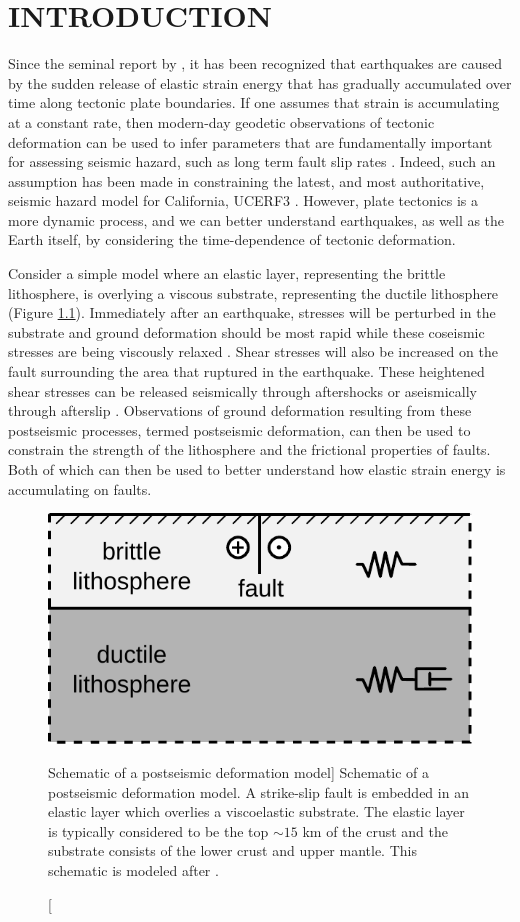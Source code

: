 \chapter{INTRODUCTION}
Since the seminal report by \citet{Reid1910}, it has been recognized that earthquakes are caused by the sudden release of elastic strain energy that has gradually accumulated over time along tectonic plate boundaries. If one assumes that strain is accumulating at a constant rate, then modern-day geodetic observations of tectonic deformation can be used to infer parameters that are fundamentally important for assessing seismic hazard, such as long term fault slip rates \citep[e.g.,][]{Savage1973,Meade2005}. Indeed, such an assumption has been made in constraining the latest, and most authoritative, seismic hazard model for California, UCERF3 \citep{Field2014}. However, plate tectonics is a more dynamic process, and we can better understand earthquakes, as well as the Earth itself, by considering the time-dependence of tectonic deformation. 

Consider a simple model where an elastic layer, representing the brittle lithosphere, is overlying a viscous substrate, representing the ductile lithosphere (Figure \ref{intro:fig:1}). Immediately after an earthquake, stresses will be perturbed in the substrate and ground deformation should be most rapid while these coseismic stresses are being viscously relaxed \citep{Nur1974,Savage1978}. Shear stresses will also be increased on the fault surrounding the area that ruptured in the earthquake. These heightened shear stresses can be released seismically through aftershocks or aseismically through afterslip \citep{Marone1991}. Observations of ground deformation resulting from these postseismic processes, termed postseismic deformation, can then be used to constrain the strength of the lithosphere and the frictional properties of faults. Both of which can then be used to better understand how elastic strain energy is accumulating on faults. 

\begin{figure}
\includegraphics{schematic}
\caption
[Schematic of a postseismic deformation model]
{Schematic of a postseismic deformation model. A strike-slip fault is embedded in an elastic layer which overlies a viscoelastic substrate. The elastic layer is typically considered to be the top ${\sim}15$ km of the crust and the substrate consists of the lower crust and upper mantle.  This schematic is modeled after \citep{Savage1978}.}
\label{intro:fig:1}
\end{figure}

